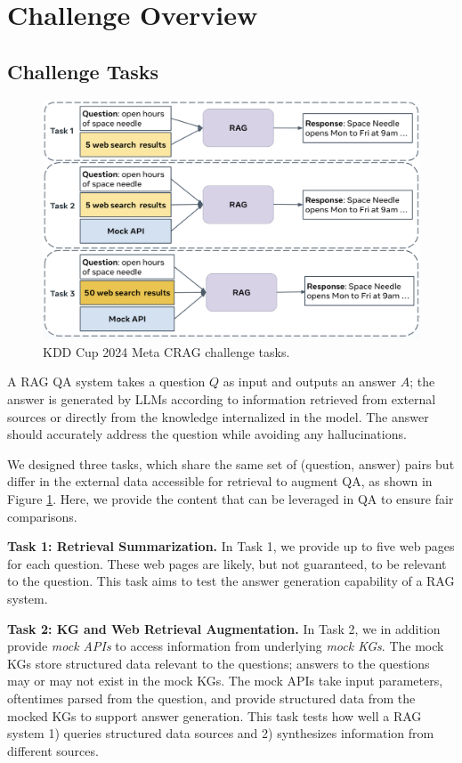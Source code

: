 \section{Challenge Overview}
\label{sec:summary_of_the_crag_challenge}

\subsection{Challenge Tasks}
\begin{figure}[t]
  \centering
  \includegraphics[width=12cm]{submissions/Xiao2024/figs/tasks.png}
  \caption{KDD Cup 2024 Meta CRAG challenge tasks.}
  \label{fig:competition_task}
\end{figure}

A RAG QA system takes a question $Q$ as input and outputs an answer $A$; the answer is generated by LLMs according to information retrieved from external sources or directly from the knowledge internalized in the model. The answer should accurately address the question while avoiding any hallucinations.  


We designed three tasks, which share the same set of (question, answer) pairs but differ in the external data accessible for retrieval to augment QA, as shown in Figure \ref{fig:competition_task}. Here, we provide the content that can be leveraged in QA to ensure fair comparisons.

\noindent
\textbf{Task 1: Retrieval Summarization.} In Task 1, we provide up to five web pages for each question. These web pages are likely, but not guaranteed, to be relevant to the question. This task aims to test the answer generation capability of a RAG system.

\noindent
\textbf{Task 2: KG and Web Retrieval Augmentation.} In Task 2, we in addition provide {\em mock APIs} to access information from underlying {\em mock KGs}. The mock KGs store structured data relevant to the questions; answers to the questions may or may not exist in the mock KGs. The mock APIs take input parameters, oftentimes parsed from the question, and provide structured data from the mocked KGs to support answer generation. This task tests how well a RAG system 1) queries structured data sources and 2) synthesizes information from different sources. 

